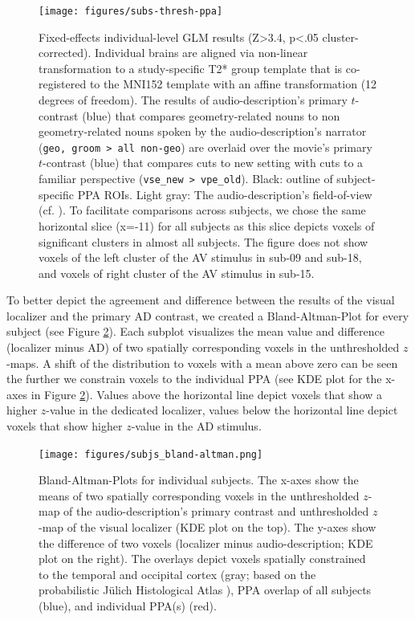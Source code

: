 \documentclass[english]{article}
\begin{document}
\begin{figure}[h!]
\centering
    \texttt{[image: figures/subs-thresh-ppa]}
    \caption{Fixed-effects individual-level GLM results (Z>3.4, p<.05
        cluster-corrected).
        Individual brains are aligned via non-linear
        transformation to a study-specific T2* group template that is
        co-registered to the MNI152 template with an affine transformation (12
        degrees of freedom).
        The results of audio-description's primary
        $t$-contrast (blue) that compares geometry-related nouns to non
        geometry-related nouns spoken by the audio-description's narrator
        (\texttt{geo, groom > all non-geo}) are overlaid over the movie's
        primary $t$-contrast (blue) that compares cuts to new setting with cuts
        to a familiar perspective (\texttt{vse\_new > vpe\_old}).
        Black:
        outline of subject-specific PPA ROIs.
        Light gray: The
        audio-description's field-of-view (cf. \citep{hanke2014audiomovie}).
        To facilitate comparisons across subjects, we chose the same horizontal
        slice (x=-11) for all subjects as this slice depicts voxels of
        significant clusters in almost all subjects.
        The figure does not show voxels of the left cluster of the AV stimulus
        in sub-09 and sub-18, and voxels of right cluster of the AV stimulus in
        sub-15.}
    \label{fig:subs-thresh-ppa}
\end{figure}

To better depict the agreement and difference between the results of the visual
localizer and the primary AD contrast, we created a Bland-Altman-Plot for every
subject (see Figure \ref{fig:bland-altman}).
Each subplot visualizes the mean value and difference (localizer minus AD) of
two spatially corresponding voxels in the unthresholded $z$-maps.
A shift of the distribution to voxels with a mean above zero can be seen the
further we constrain voxels to the individual PPA (see KDE plot for the x-axes
in Figure \ref{fig:bland-altman}).
Values above the horizontal line depict voxels that show a higher $z$-value in
the dedicated localizer, values below the horizontal line depict voxels that
show higher $z$-value in the AD stimulus.

\begin{figure}[h!]
\centering
    \texttt{[image: figures/subjs\_bland-altman.png]}
    \caption{Bland-Altman-Plots for individual subjects.
    The x-axes show the means of two spatially corresponding voxels in the
    unthresholded $z$-map of the audio-description's primary contrast and
    unthresholded $z$-map of the visual localizer (KDE plot on the top).
    The y-axes show the difference of two voxels (localizer minus
    audio-description; KDE plot on the right).
    The overlays depict voxels spatially constrained to the
    temporal and occipital cortex (gray; based on the probabilistic Jülich
    Histological Atlas \citep{eickhoff2005toolbox, eickhoff2007assignment}),
    PPA overlap of all subjects (blue),
    and individual PPA(s) (red).}
    \label{fig:bland-altman}
\end{figure}
\end{document}
